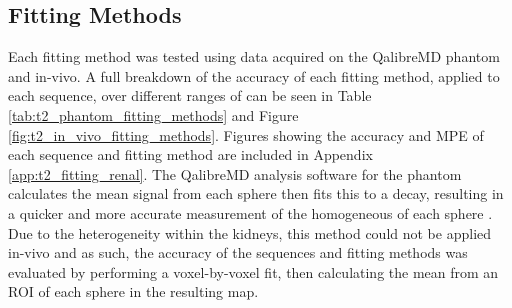 \subsection{Fitting Methods}
\label{subsec:t2_fitting_methods_results}
Each fitting method was tested using data acquired on the QalibreMD phantom and in-vivo. A full breakdown of the accuracy of each fitting method, applied to each sequence, over different ranges of \ttwo can be seen in Table \ref{tab:t2_phantom_fitting_methods} and Figure \ref{fig:t2_in_vivo_fitting_methods}. Figures showing the accuracy and \ac{MPE} of each sequence and fitting method are included in Appendix \ref{app:t2_fitting_renal}. The QalibreMD analysis software for the phantom calculates the mean signal from each sphere then fits this to a \ttwo decay, resulting in a quicker and more accurate measurement of the homogeneous \ttwo of each sphere \cite{mristandards_mristandardsphantomviewer_2020}. Due to the heterogeneity within the kidneys, this method could not be applied in-vivo and as such, the accuracy of the sequences and fitting methods was evaluated by performing a voxel-by-voxel fit, then calculating the mean \ttwo from an \ac{ROI} of each sphere in the resulting map.


